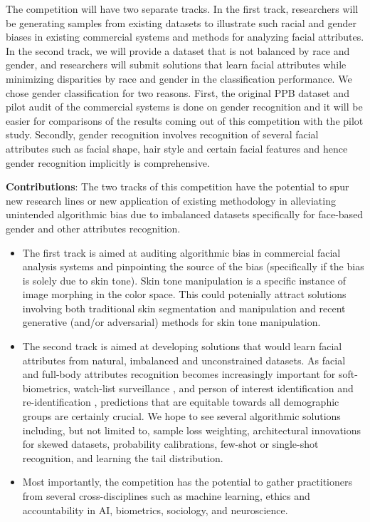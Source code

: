 \documentclass[11pt, oneside]{article}
\makeatletter
\let\@internalcite\cite
\def\cite{\def\citeauthoryear##1##2{##1, ##2}\@internalcite}
\makeatother
\begin{document}
The competition will have two separate tracks. In the first track, researchers
will be generating samples from existing datasets to illustrate such racial and
gender biases in existing commercial systems and
methods for analyzing facial attributes. In the second track, we will provide a dataset that is not balanced by race and
gender, and researchers will submit solutions that learn facial attributes
while minimizing disparities by race and gender in the classification performance.
We chose gender classification for two reasons. First, the original PPB dataset
and pilot audit of the commercial systems is done on gender recognition and it
will be easier for comparisons of the results coming out of this competition
with the pilot study. Secondly, gender recognition involves recognition of
several facial attributes such as facial shape, hair style and certain facial
features and hence gender recognition implicitly is comprehensive.

{\bf Contributions}: The two tracks of this competition have the potential to 
spur new research lines or new application of existing methodology in 
alleviating unintended algorithmic bias due to imbalanced datasets specifically 
for face-based gender and other attributes recognition. 
\begin{itemize}
	\item The first track is aimed at auditing algorithmic bias in commercial 
	facial analysis systems and pinpointing the source of the bias 
	(specifically if the bias is solely due to skin tone). Skin tone 
	manipulation is a specific instance of image morphing in the color space. 
	This could potenially attract solutions involving both traditional skin 
	segmentation and manipulation \cite{martinson2013identifying} and recent 
	generative (and/or adversarial) 
	methods for skin tone manipulation.
	\item The second track is aimed at developing solutions that would learn 
	facial attributes from natural, imbalanced and unconstrained datasets. As 
	facial and full-body attributes recognition \cite{bekele2017multi} becomes 
	increasingly important
	for soft-biometrics, watch-list surveillance  \cite{kamgar2011toward}, and
	person of interest identification and re-identification 
	\cite{best2014unconstrained}, predictions that are equitable towards all 
	demographic groups are certainly crucial. We hope to see several 
	algorithmic solutions including, but not limited to, sample loss weighting, 
	architectural innovations for skewed datasets, probability calibrations, 
	few-shot or single-shot recognition, and learning the tail distribution.
	\item Most importantly, the competition has the potential to gather 
	practitioners from several cross-disciplines such as machine learning, 
	ethics and accountability in AI, biometrics, sociology, and neuroscience.
\end{itemize}
\end{document}
